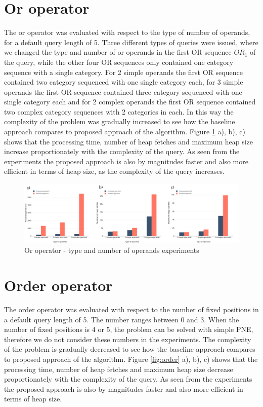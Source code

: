 \section{Or operator}
\label{sec:experimentsOr}

The or operator was evaluated with respect to the type of number of operands, for a default query length of 5.  Three different types of queries were issued, where we changed the type and number of or operands in the first OR sequence $OR_1$ of the query, while the other four OR sequences only contained one category sequence with a single category. For 2 simple operands the first OR sequence contained two category sequenced with one single category each, for 3 simple operands the first OR sequence contained three category sequenced with one single category each and for 2 complex operands the first OR sequence contained two complex category sequences with 2 categories in each. In this way the complexity of the problem was gradually increased to see how the baseline approach compares to proposed approach of the algorithm.  
Figure \ref{fig:or} a), b), c) shows that the processing time, number of heap fetches and maximum heap size increase proportionately with the complexity of the query. As seen from the experiments the proposed approach is also by magnitudes faster and also more efficient in terms of heap size, as the complexity of the query increases. 

\begin{figure}[H]
	\includegraphics[scale=0.25]{images/or.png}
	\centering
	\caption{Or operator - type and number of operands experiments}
	\label{fig:or}
\end{figure}


\section{Order operator}
\label{sec:experimentsOrder}

The order operator was evaluated with respect to the number of fixed positions in a default query length of 5. The number ranges between 0 and 3. When the number of fixed positions is 4 or 5, the problem can be solved with simple PNE, therefore we do not consider these numbers in the experiments. The complexity of the problem is gradually decreased to see how the baseline approach compares to proposed approach of the algorithm.  
Figure \ref{fig:order} a), b), c) shows that the processing time, number of heap fetches and maximum heap size decrease proportionately with the complexity of the query. As seen from the experiments the proposed approach is also by magnitudes faster and also more efficient in terms of heap size.

